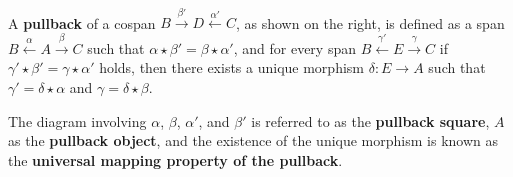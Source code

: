  
\begin{definition}
    \label{def:cat:pb}
    \ \newline
\noindent
\begin{minipage}{0.7\textwidth}  
   A \textbf{pullback} of a cospan \(B \overset{\beta'}{\rightarrow} D \overset{\alpha'}{\leftarrow} C \), as shown on the right, is defined as a span \( B \overset{\alpha}{\leftarrow} A \overset{\beta}{\rightarrow} C \) such that \( \alpha \star \beta' = \beta \star \alpha' \), and for every span \( B \overset{\gamma'}{\leftarrow} E \overset{\gamma}{\rightarrow} C \) if \(\gamma' \star \beta' = \gamma \star \alpha'\) holds, then there exists a unique morphism \(\delta: E \to A\) such that $\gamma' = \delta \star \alpha$ and $\gamma = \delta \star \beta$. 
\end{minipage}
\hfill
\begin{minipage}{0.299\textwidth}
    \hfill
{}
\end{minipage}
The diagram involving \(\alpha\), \(\beta\), \(\alpha'\), and \(\beta'\) is referred to as the \textbf{pullback square}, \(A\) as the \textbf{pullback object}, and the existence of the unique morphism is known as the \textbf{universal mapping property of the pullback}.
\end{definition} 